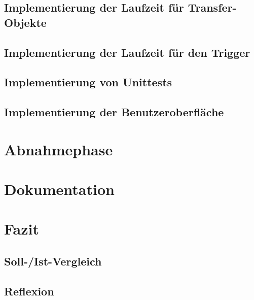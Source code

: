 \documentclass[ngerman,11pt,a4paper,titlepage]{article}
\begin{document}
		\subsection{Implementierung der Laufzeit für Transfer-Objekte}
		\label{subsec:implementierunglaufzeittransfer}
		\implementierunglaufzeittransferText
		
		\subsection{Implementierung der Laufzeit für den Trigger}
		\label{subsec:implementierunglaufzeittrigger}
		\implementierunglaufzeittriggerText
		
		\subsection{Implementierung von Unittests}
		\label{subsec:implementierungunittests}
		\implementierungunittestsText
		
		\subsection{Implementierung der Benutzeroberfläche}
		\label{subsec:implementierungbenuzteroberflaeche}
		\implementierungbenuzteroberflaecheText
	
	\section{Abnahmephase}
	\label{sec
	}
	\abnahmephaseText
	
	\section{Dokumentation}
	\label{sec
	}
	\dokumentationText
	
	\section{Fazit}
	\label{sec
	}
	\fazitText
		\subsection{Soll-/Ist-Vergleich}
		\label{subsec:sollistvergleich}
		\sollistvergleichText
		
		\subsection{Reflexion}
		\label{subsec:reflexion}
		
\end{document}
